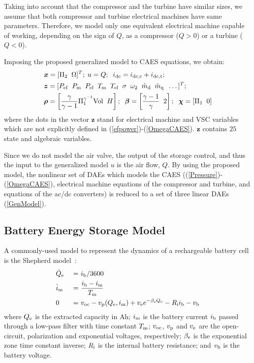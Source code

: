\documentclass[journal, a4paper]{IEEEtran}
\newcommand{\bfg}[1]{\boldsymbol{#1}}
\begin{document}
Taking into account that the compressor and the turbine have similar
sizes, we assume that both compressor and turbine electrical machines
have same parameters.  Therefore, we model only one equivalent
electrical machine capable of working, depending on the sign of $Q$,
as a compressor ($Q > 0$) or a turbine ($Q < 0$).

Imposing the proposed generalized model to CAES equations, we obtain:
\begin{alignat}{3}
  \nonumber & \boldsymbol{x} = [\Pi_2 \; \; \Omega]^T; \; u = Q; \; \;
  i_{\rm dc} = i_{\rm dc,c} + i_{\rm dc,t}; \\
  \label{caesgen}
   &   \boldsymbol{z} = [P_{\rm ef} \; \; P_{\rm m} \; \; P_{\rm el} \; \;
    T_{\rm m} \; \; T_{\rm el} \; \; \sigma \; \; \omega_2 \;
    \; \hat{m}_{\rm d} \; \; \hat{m}_{\rm q} \; \; \dots]^T;  \\ 
  \nonumber & \boldsymbol{\rho} =
  \left[\frac{\gamma}{\gamma - 1} \Pi_{\rm 1}^{\gamma ^ {- 1}} {\rm
      Vol} \; \; H \right] ; \; \; \boldsymbol{\beta} = \left[
    \frac{\gamma - 1}{\gamma} \; \; 2 \right]; \; \; \boldsymbol{\chi} =
  \left[\Pi_{\rm 1} \; \; 0 \right]
\end{alignat}
where the dots in the vector $\bfg z$ stand for
electrical machine and VSC variables which are not explicitly defined
in (\ref{efpower})-(\ref{OmegaCAES}).  $\bfg z$ contains $25$ state
and algebraic variables. 

Since we do not model the air valve, the output of the storage
control, and thus the input to the generalized model $u$ is the air
flow, $Q$.  By using the proposed model, the nonlinear set of DAEs
which models the CAES ((\ref{Pressure})-(\ref{OmegaCAES}),
electrical machine equations of the compressor and turbine, and
equations of the ac/dc converters) is reduced to a set of three linear
DAEs (\ref{GenModel}).



\subsection{Battery Energy Storage Model}
\label{subsec:bess}

A commonly-used model to represent the dynamics of a rechargeable battery
cell is the Shepherd model~\cite{shepherd:65}:
\begin{alignat}{3}
  \nonumber & \dot{Q}_{\rm e} \ &=& \ i_{\rm b}/3600 \\
  \label{bessmodel}	
  & \dot{i}_{\rm m} \ &=&\ \frac{i_{\rm b} - i_{\rm m}}{T_{\rm m}}
  \\ \nonumber & 0 \ &=& \ v_{\rm oc} - v_{\rm p}(Q_{\rm e}, i_{\rm
    m}) + v_{\rm e} e ^{-\beta _{\rm e} Q_{\rm e}} - R_{\rm i} i_{\rm
    b} - v_{\rm b}
\end{alignat}
where $Q_{\rm e}$ is the extracted capacity in Ah; $i_{\rm m}$ is the
battery current $i_{\rm b}$ passed through a low-pass filter with time
constant $T_{\rm m}$; $v_{\rm oc}$, $v_{\rm p}$ and $v_{\rm e}$ are
the open-circuit, polarization and exponential voltages, respectively;
$\beta_{\rm e}$ is the exponential zone time constant inverse; $R_{\rm
  i}$ is the internal battery resistance; and $v_{\rm b}$ is the
battery voltage.
\end{document}
